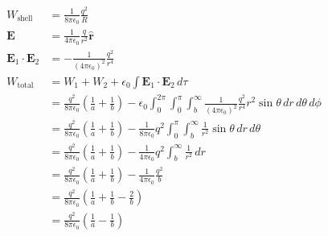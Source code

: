 \documentclass{article}
\renewcommand{\vec}[1]{\boldsymbol{\mathbf{#1}}}
\newcommand{\uvec}[1]{\hat{\vec{#1}}}
\newcommand{\ke}{\frac{1}{4 \pi \epsilon_0}}
\begin{document}
\begin{enumerate}
        \begin{align*}
          W_\text{shell}            & = \frac{1}{8 \pi \epsilon_0} \frac{q^2}{R}                                                                                                                                                                            \\
          \vec{E}                   & = \ke \frac{q}{r^2} \uvec{r}                                                                                                                                                                                          \\
          \vec{E}_1 \cdot \vec{E}_2 & = -\frac{1}{(4 \pi \epsilon_0)^2} \frac{q^2}{r^4}                                                                                                                                                                     \\
          W_\text{total}            & = W_1 + W_2 + \epsilon_0 \int \vec{E}_1 \cdot \vec{E}_2 \,d \tau                                                                                                                                                      \\
                                    & = \frac{q^2}{8 \pi \epsilon_0} \left( \frac{1}{a} + \frac{1}{b} \right) - \epsilon_0 \int_0^{2 \pi} \int_0^\pi \int_b^\infty \frac{1}{(4 \pi \epsilon_0)^2} \frac{q^2}{r^4} r^2 \sin \theta \,d r \,d \theta \,d \phi \\
                                    & = \frac{q^2}{8 \pi \epsilon_0} \left( \frac{1}{a} + \frac{1}{b} \right) - \frac{1}{8 \pi \epsilon_0} q^2 \int_0^\pi \int_b^\infty \frac{1}{r^2} \sin \theta \,d r \,d \theta                                          \\
                                    & = \frac{q^2}{8 \pi \epsilon_0} \left( \frac{1}{a} + \frac{1}{b} \right) - \frac{1}{4 \pi \epsilon_0} q^2 \int_b^\infty \frac{1}{r^2} \,d r                                                                            \\
                                    & = \frac{q^2}{8 \pi \epsilon_0} \left( \frac{1}{a} + \frac{1}{b} \right) - \frac{1}{4 \pi \epsilon_0} \frac{q^2}{b}                                                                                                    \\
                                    & = \frac{q^2}{8 \pi \epsilon_0} \left( \frac{1}{a} + \frac{1}{b} - \frac{2}{b} \right)                                                                                                                                 \\
                                    & = \frac{q^2}{8 \pi \epsilon_0} \left( \frac{1}{a} - \frac{1}{b} \right)
        \end{align*}
\end{enumerate}
\end{document}
